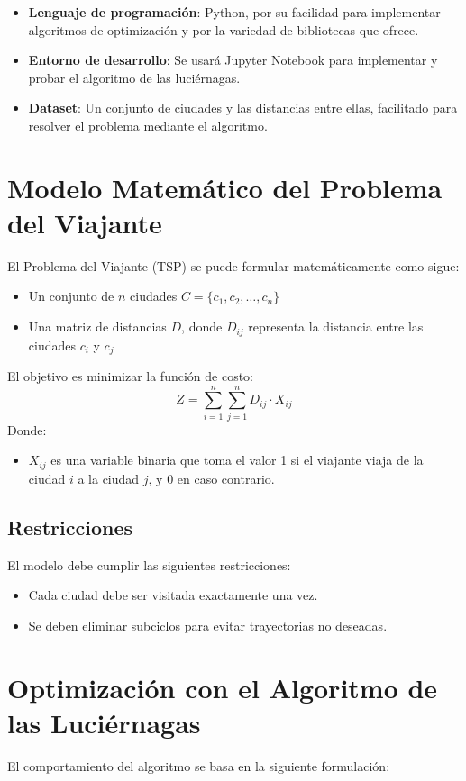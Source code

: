 \documentclass{article}
\begin{document}
\begin{itemize}
    \item \textbf{Lenguaje de programación}: Python, por su facilidad para implementar algoritmos de optimización y por la variedad de bibliotecas que ofrece.
    \item \textbf{Entorno de desarrollo}: Se usará Jupyter Notebook para implementar y probar el algoritmo de las luciérnagas.
    \item \textbf{Dataset}: Un conjunto de ciudades y las distancias entre ellas, facilitado para resolver el problema mediante el algoritmo.
\end{itemize}

\section{Modelo Matemático del Problema del Viajante}
El Problema del Viajante (TSP) se puede formular matemáticamente como sigue:

\begin{itemize}
    \item Un conjunto de \( n \) ciudades \( C = \{c_1, c_2, \dots, c_n\} \)
    \item Una matriz de distancias \( D \), donde \( D_{ij} \) representa la distancia entre las ciudades \( c_i \) y \( c_j \)
\end{itemize}

El objetivo es minimizar la función de costo:
\[
Z = \sum_{i=1}^{n}\sum_{j=1}^{n} D_{ij} \cdot X_{ij}
\]
Donde:
\begin{itemize}
    \item \( X_{ij} \) es una variable binaria que toma el valor 1 si el viajante viaja de la ciudad \( i \) a la ciudad \( j \), y 0 en caso contrario.
\end{itemize}

\subsection{Restricciones}
El modelo debe cumplir las siguientes restricciones:
\begin{itemize}
    \item Cada ciudad debe ser visitada exactamente una vez.
    \item Se deben eliminar subciclos para evitar trayectorias no deseadas.
\end{itemize}

\section{Optimización con el Algoritmo de las Luciérnagas}
El comportamiento del algoritmo se basa en la siguiente formulación:
\end{document}
